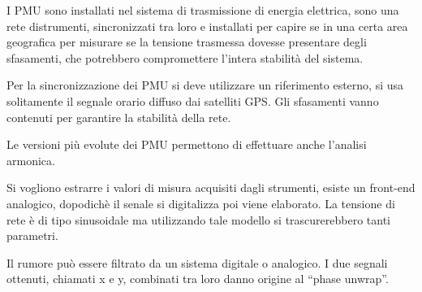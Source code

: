 I PMU sono installati nel sistema di trasmissione di energia elettrica, sono
una rete distrumenti, sincronizzati tra loro e installati per capire se in una
certa area geografica per misurare se la tensione trasmessa dovesse presentare
degli sfasamenti, che potrebbero compromettere l'intera stabilità del sistema.

Per la sincronizzazione dei PMU si deve utilizzare un riferimento esterno, si
usa solitamente il segnale orario diffuso dai satelliti GPS.
Gli sfasamenti vanno contenuti per garantire la stabilità della rete.

Le versioni più evolute dei PMU permettono di effettuare anche l'analisi
armonica.

Si vogliono estrarre i valori di misura acquisiti dagli strumenti, esiste un
front-end analogico, dopodichè il senale si digitalizza poi viene elaborato.
La tensione di rete è di tipo sinusoidale ma utilizzando tale modello si
trascurerebbero tanti parametri.

Il rumore può essere filtrato da un sistema digitale o
analogico.
I due segnali ottenuti, chiamati x e y, combinati tra loro danno origine al
``phase unwrap''.



